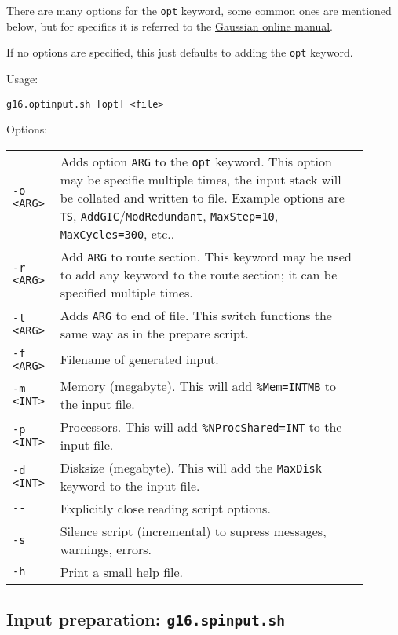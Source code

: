 \documentclass[   %
  final,          %
  a4paper         %
]{article}
\begin{document}
There are many options for the \texttt{opt} keyword, some common ones are mentioned below,
but for specifics it is referred to the \href{http://gaussian.com/opt/}{Gaussian online manual}.

If no options are specified, this just defaults to adding the \texttt{opt} keyword.

Usage: 

\lstinline`g16.optinput.sh [opt] <file>`

Options:

\begin{longtable}{p{0.1\linewidth}p{0.8\linewidth}}
  {\lstinline`-o <ARG>`} & Adds option {\lstinline`ARG`} to the \texttt{opt} keyword. 
    This option may be specifie multiple times, the input stack will be collated and written to file.
    Example options are \texttt{TS}, \texttt{AddGIC}/\texttt{ModRedundant}, \texttt{MaxStep=10}, \texttt{MaxCycles=300}, etc.. \\
  {\lstinline`-r <ARG>`} & Add {\lstinline`ARG`} to route section. 
    This keyword may be used to add any keyword to the route section; 
    it can be specified multiple times.\\
  {\lstinline`-t <ARG>`} & Adds {\lstinline`ARG`} to end of file. 
    This switch functions the same way as in the prepare script. \\
  {\lstinline`-f <ARG>`} & Filename of generated input. \\
  {\lstinline`-m <INT>`} & Memory (megabyte). This will add \texttt{\%Mem={\lstinline`INT`}MB} to the input file. \\
  {\lstinline`-p <INT>`} & Processors. This will add \texttt{\%NProcShared={\lstinline`INT`}} to the input file. \\
  {\lstinline`-d <INT>`} & Disksize (megabyte). This will add the \texttt{MaxDisk} keyword to the input file. \\
  {\lstinline`--`}       & Explicitly close reading script options. \\
  {\lstinline`-s`}       & Silence script (incremental) to supress messages, warnings, errors. \\
  {\lstinline`-h`}       & Print a small help file. \\
\end{longtable}

\subsection{Input preparation: \texorpdfstring{{\lstinline`g16.spinput.sh`}}{g16.spinput.sh}}
\end{document}
